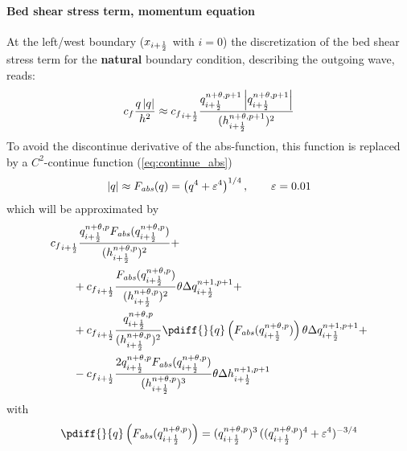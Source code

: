 \paragraph*{Bed shear stress term, momentum equation}
At the left/west boundary ($x_{i+\frac{1}{2}}$ with $i=0$) the discretization of the bed shear stress term for the \textbf{natural} boundary condition, describing the outgoing wave, reads:
\begin{align}
    c_f \frac{q\left| q \right|}{h^2} \approx
    {c_f}_{i+\frac{1}{2}} \frac{q^{n+\theta,p+1}_{i+\frac{1}{2}}\left| q^{n+\theta,p+1}_{i+\frac{1}{2}} \right|}{(h^{n+\theta,p+1}_{i+\frac{1}{2}})^2}
\end{align}
To avoid the discontinue derivative of the abs-function, this function is replaced by a $C^2$-continue function (\autoref{eq:continue_abs})
%
\begin{align}
    \left| q \right| \approx F_{\it abs}(q) = \left( q^4 + \varepsilon^4 \right)^{1/4}, \qquad \varepsilon = 0.01
\end{align}
which will be approximated by
\begin{align}
    & {c_f}_{i+\half} \frac{q^{n+\theta,p}_{i+\half}\Fabs{q^{n+\theta,p}_{i+\half}}}{(h^{n+\theta,p}_{i+\half})^2}
    +
    \nonumber \\*
    & \qquad + {c_f}_{i+\half} \frac{\Fabs{q^{n+\theta,p}_{i+\half}}}{(h^{n+\theta,p}_{i+\half})^2} \theta \Delta q^{n+1,p+1}_{i+\half}
    +
    \nonumber \\*
    & \qquad + {c_f}_{i+\half} \frac{q^{n+\theta,p}_{i+\half}}{(h^{n+\theta,p}_{i+\half})^2} \pdiff{}{q}\left(\Fabs{q^{n+\theta,p}_{i+\half}}\right)  \theta \Delta q^{n+1,p+1}_{i+\half}
    +
    \nonumber \\*
    & \qquad - {c_f}_{i+\half} \frac{2 q^{n+\theta,p}_{i+\half}\Fabs{q^{n+\theta,p}_{i+\half}}}{(h^{n+\theta,p}_{i+\half})^3} \theta \Delta h^{n+1,p+1}_{i+\half}
\end{align}
with
\begin{align}
    \pdiff{}{q}\left(\Fabs{q^{n+\theta,p}_{i+\half}}\right) =
    (q^{n+\theta, p}_{i+\half})^3\,((q^{n+\theta, p}_{i+\half})^4 + \eps^4)^{-3/4}
\end{align}
